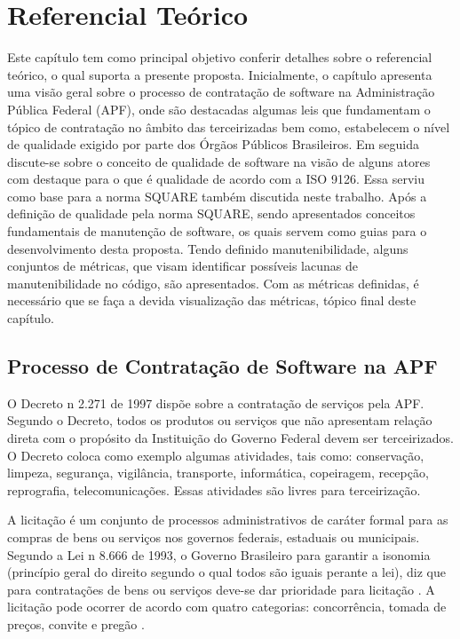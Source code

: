 
\chapter[Referencial Teórico]{Referencial Teórico}	
Este capítulo tem como principal objetivo conferir detalhes sobre o referencial teórico, o qual suporta a presente proposta.    Inicialmente, o capítulo apresenta uma visão geral sobre o processo de contratação de software na Administração Pública Federal (APF), onde são destacadas algumas leis que fundamentam o tópico de contratação no âmbito das terceirizadas bem como, estabelecem o nível de qualidade exigido por parte dos Órgãos Públicos Brasileiros. Em seguida discute-se sobre o conceito de qualidade de software na visão de alguns atores com destaque para o que é qualidade de acordo com a ISO 9126. Essa serviu como base para a norma SQUARE também discutida neste trabalho. Após a definição de qualidade pela norma SQUARE, sendo apresentados conceitos fundamentais de manutenção de software, os quais servem como guias para o desenvolvimento desta proposta. Tendo definido manutenibilidade, alguns conjuntos de métricas, que visam identificar possíveis lacunas de manutenibilidade no código, são apresentados. Com as métricas definidas, é necessário que se faça a devida visualização das métricas, tópico final deste capítulo.
	
\section{Processo de Contratação de Software na APF}
O Decreto n 2.271 de 1997 \cite{decreto_2271} dispõe sobre a contratação de serviços pela APF. Segundo o Decreto, todos os produtos ou serviços que não apresentam relação direta com o propósito da Instituição do Governo Federal devem ser terceirizados. O Decreto coloca como exemplo algumas atividades, tais como: conservação, limpeza, segurança, vigilância, transporte, informática, copeiragem, recepção, reprografia, telecomunicações. Essas atividades são livres para terceirização.

A licitação é um conjunto de processos administrativos de caráter formal para as compras de bens ou serviços nos governos federais, estaduais ou municipais. Segundo a Lei  n 8.666 de 1993, o Governo Brasileiro para garantir a isonomia (princípio geral do direito segundo o qual todos são iguais perante a lei), diz que para contratações de bens ou serviços deve-se dar prioridade para licitação \cite{Lei_1993}. A licitação pode ocorrer de acordo com quatro categorias: concorrência, tomada de preços, convite e pregão \cite{brazil_licitacoes_2010}.


